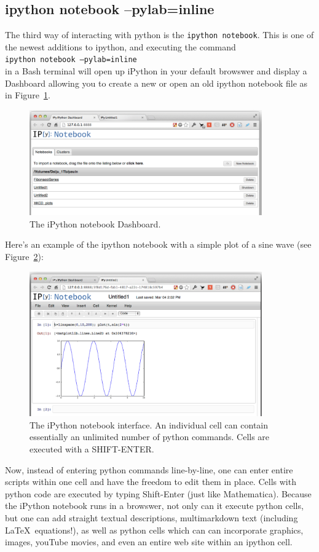 \subsection{ipython notebook --pylab=inline }
\label{sec:iPythonNotebook}

The third way of interacting with python is the \texttt{ipython notebook}. This is one of the newest additions to ipython, and executing the command \\[5mm] 
 \texttt{ipython notebook --pylab=inline}\\[5mm] 
in a Bash terminal will open up iPython in your default browswer and display a Dashboard allowing you to create a new or open an old ipython notebook file as in Figure~\ref{fig:iPythonNotebookDashboard}. 
\begin{figure}[h]
	\centering
	\includegraphics[width=10cm]{Figures/BasicPython/iPythonNotebookDashboard}
	\caption{The iPython notebook Dashboard. }
	\label{fig:iPythonNotebookDashboard}       %
\end{figure}
Here's an example of the ipython notebook with a simple plot of a sine wave (see Figure~\ref{fig:iPythonNotebook}):
\begin{figure}[h]
	\centering
	\includegraphics[width=10cm]{Figures/BasicPython/iPythonNotebook}
	\caption{The iPython notebook interface. An individual cell can contain essentially an unlimited number of python commands. Cells are executed with a SHIFT-ENTER. }
	\label{fig:iPythonNotebook}       %
\end{figure}
Now, instead of entering python commands line-by-line, one can enter entire scripts within one cell and have the freedom to edit them in place. Cells with python code are executed by typing Shift-Enter (just like Mathematica). Because the iPython notebook runs in a browswer, not only can it execute python cells, but one can add straight textual descriptions, multimarkdown text (including \LaTeX\ equations!), as well as python cells which can can incorporate graphics, images, youTube movies, and even an entire web site within an ipython cell. 

